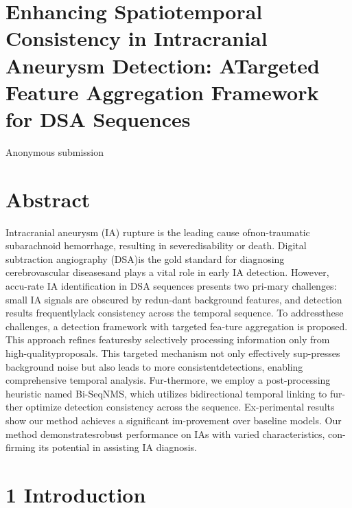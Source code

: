 \documentclass[
  10
]{article}
\author{}
\date{}
\begin{document}
\section{Enhancing Spatiotemporal Consistency in Intracranial Aneurysm
Detection: ATargeted Feature Aggregation Framework for DSA
Sequences}\label{enhancing-spatiotemporal-consistency-in-intracranial-aneurysm-detection-atargeted-feature-aggregation-framework-for-dsa-sequences}

Anonymous submission

\section{Abstract}\label{abstract}

Intracranial aneurysm (IA) rupture is the leading cause ofnon-traumatic
subarachnoid hemorrhage, resulting in severedisability or death. Digital
subtraction angiography (DSA)is the gold standard for diagnosing
cerebrovascular diseasesand plays a vital role in early IA detection.
However, accu-rate IA identification in DSA sequences presents two
pri-mary challenges: small IA signals are obscured by redun-dant
background features, and detection results frequentlylack consistency
across the temporal sequence. To addressthese challenges, a detection
framework with targeted fea-ture aggregation is proposed. This approach
refines featuresby selectively processing information only from
high-qualityproposals. This targeted mechanism not only effectively
sup-presses background noise but also leads to more
consistentdetections, enabling comprehensive temporal analysis.
Fur-thermore, we employ a post-processing heuristic named Bi-SeqNMS,
which utilizes bidirectional temporal linking to fur-ther optimize
detection consistency across the sequence. Ex-perimental results show
our method achieves a significant im-provement over baseline models. Our
method demonstratesrobust performance on IAs with varied
characteristics, con-firming its potential in assisting IA diagnosis.

\section{1 Introduction}\label{introduction}
\end{document}
